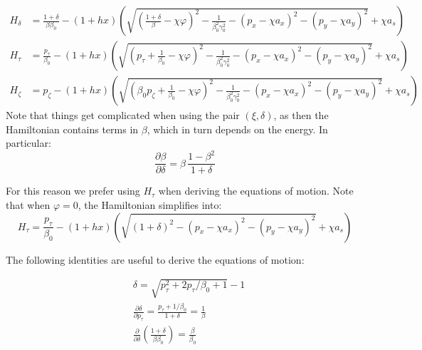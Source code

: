 \begin{align*}
 H_\delta   &= \frac{1+\delta}{\beta\beta_0} - (1+h x) \left(
      \sqrt{ \left(\frac{1+\delta}{\beta}-\chi\varphi\right)^2
           - \frac{1}{\beta_0^2\gamma_0^2} 
           - (p_x - \chi a_x)^2
           - (p_y - \chi a_y)^2}
       + \chi a_s
    \right) \\
 H_\tau   &= \frac{p_\tau}{\beta_0} - (1+h x) \left(
      \sqrt{ \left(p_\tau+\frac{1}{\beta_0}-\chi\varphi\right)^2
           - \frac{1}{\beta_0^2\gamma_0^2}
           - (p_x - \chi a_x)^2
           - (p_y - \chi a_y)^2}
       + \chi a_s
    \right) \\
  H_\zeta &= p_\zeta - (1+h x) \left(
      \sqrt{ \left(\beta_0 p_\zeta+\frac{1}{\beta_0}-\chi\varphi\right)^2
           - \frac{1}{\beta_0^2\gamma_0^2}
           - (p_x - \chi a_x)^2
           - (p_y - \chi a_y)^2}
       + \chi a_s
    \right)
\end{align*}
Note that things get complicated when using the pair $(\xi, \delta)$, as then the
Hamiltonian contains terms in $\beta$, which in turn depends on the energy.  In particular:
\begin{equation}
\frac{\partial \beta}{\partial \delta} =
    \beta\, \frac{1-\beta^2}{1+\delta}
\end{equation}

For this reason we prefer using $H_\tau$ when deriving the equations of motion. Note
that when $\varphi=0$, the Hamiltonian simplifies into:
\begin{equation}
H_\tau  =
\frac{p_\tau}{\beta_0} - (1+h x) \left(
      \sqrt{ \left(1+\delta\right)^2
           - (p_x - \chi a_x)^2
           - (p_y - \chi a_y)^2}
       + \chi a_s
    \right)
\end{equation}

The following identities are useful to derive the equations of motion:

\begin{align}
&\delta =
    \sqrt{p_\tau^2 + 2 p_\tau/\beta_0 +1} - 1 \\
&\frac{\partial \delta}{\partial p_\tau} =
    \frac{p_\tau+1/\beta_0}{1+\delta} = \frac{1}{\beta} \\
&\frac{\partial}{\partial\delta}\left( 
    \frac{1+\delta}{\beta\beta_0}
  \right)=
    \frac{\beta}{\beta_0}
\end{align}

